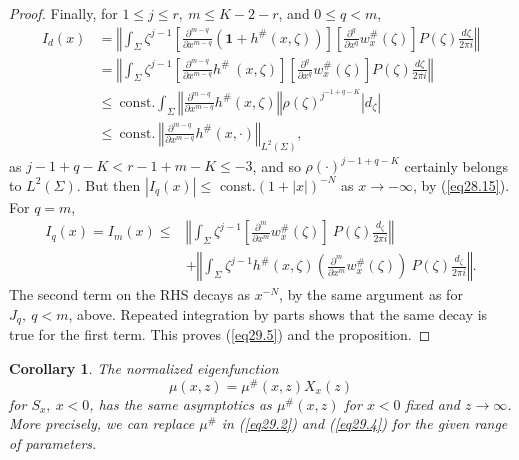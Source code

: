 \documentclass{surv-l}
\theoremstyle{plain}
\newtheorem{corollary}[theorem]{Corollary}
\theoremstyle{definition}
\numberwithin{equation}{chapter}
\begin{document}
\begin{proof}
Finally, for $1\leq j\leq r,\ m\leq K-2-r$, and $0\leq q<m$,
\begin{align*}
I_{d}(x)&=\left\Vert\int_{\Sigma}\zeta^{j-1}\left[\frac{\partial^{m-q}}{\partial x^{m-q}}(\mathbf{1}+h^{\#} (x, \zeta))\right]\left[\frac{\partial^{q}}{\partial x^{q}}w_{x}^{\#}(\zeta)\right]P(\zeta)\frac{d{\zeta}}{2\pi i}\right\Vert\\
&=\left\Vert\int_{\Sigma}\zeta^{j-1}\left[\frac{\partial^{m-q}}{\partial x^{m-q}}h^{\#}\ (x, \zeta)\right]\left[\frac{\partial^{q}}{\partial x^{q}}w_{x}^{\#}(\zeta)\right]P(\zeta)\frac{d{\zeta}}{2\pi i}\right\Vert\\
&\leq\ \mathrm{const}. \int_{\Sigma}\left\Vert\frac{\partial^{m-q}}{\partial x^{m-q}}h^{\#} (x, \zeta)\right\Vert\rho(\zeta)^{j^{-1+q-K}}|d_{\zeta}|\\
&\leq\ \mathrm{const}.\ \left\Vert\frac{\partial^{m-q}}{\partial x^{m-q}}h^{\#}(x, \cdot)\right\Vert_{L^{2}(\Sigma)},
\end{align*}
as $j-1+q-K<r-1+m-K\leq-3$, and so $\rho(\cdot)^{j-1+q-K}$ certainly belongs to $L^{2}(\Sigma)$. But then $|I_{q}(x)|\leq$ const.$(1+|x|)^{-N}$ as $ x\rightarrow-\infty$, by (\ref{eq28.15}). For $q=m$,
\begin{align*}
I_{q}(x)=I_{m}(x)\leq&\left\Vert\int_{\Sigma}\zeta^{j-1}\left[\frac{\partial^{m}}{\partial x^{m}}w_{x}^{\#}(\zeta)\right]\  P(\zeta)\frac{d_{\zeta}}{2\pi i}\right\Vert\\
&+\left\Vert\int_{\Sigma}\zeta^{j-1}h^{\#}(x,\zeta)\left(\frac{\partial^{m}}{\partial x^{m}}w_{x}^{\#}(\zeta)\right)\  P(\zeta)\frac{d_{\zeta}}{2\pi i}\right\Vert.
\end{align*}
The second term on the RHS decays as $x^{-N}$, by the same argument as for $J_{q}, \ q<m$, above. Repeated integration by parts shows that the same decay is true for the first term. This proves (\ref{eq29.5}) and the proposition.
\end{proof}
\setcounter{theorem}{7}
\begin{corollary}\label{eq29.8} The normalized eigenfunction
\begin{equation*}
\mu(x, z)=\mu^{\#}(x, z)X_{x}(z)
\end{equation*}
for $S_{x},\ x<0$, has the same asymptotics as $\mu^{\#}(x, z)$ for
$x<0$ fixed and $z \rightarrow\infty$. More precisely, we can replace
$\mu^{\#}$ in \emph{(\ref{eq29.2})} and \emph{(\ref{eq29.4})} for the given range of parameters.
\end{corollary}
\end{document}
